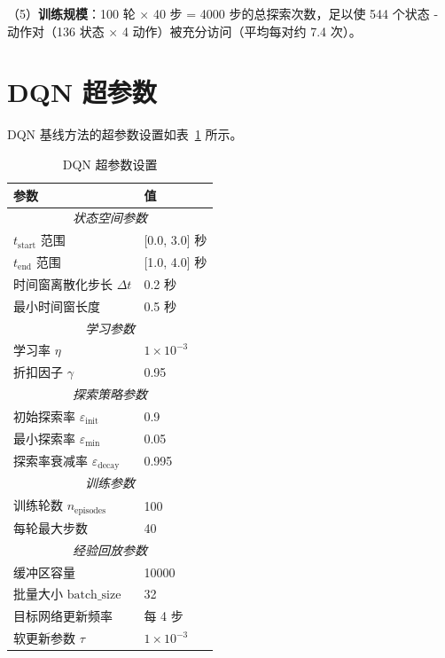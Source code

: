 （5）\textbf{训练规模}：100 轮 × 40 步 = 4000 步的总探索次数，足以使 544 个状态 - 动作对（136 状态 × 4 动作）被充分访问（平均每对约 7.4 次）。

\section{DQN 超参数}
\label{sec:dqn_params}

DQN 基线方法的超参数设置如表~\ref{tab:dqn_params} 所示。

\begin{table}[H]
\centering
\caption{DQN 超参数设置}
\label{tab:dqn_params}
\begin{tabular}{ll}
\hline
\textbf{参数} & \textbf{值} \\
\hline
\multicolumn{2}{c}{\textit{状态空间参数}} \\
\hline
$t_{\text{start}}$ 范围 & [0.0, 3.0] 秒 \\
$t_{\text{end}}$ 范围 & [1.0, 4.0] 秒 \\
时间窗离散化步长 $\Delta t$ & 0.2 秒 \\
最小时间窗长度 & 0.5 秒 \\
\hline
\multicolumn{2}{c}{\textit{学习参数}} \\
\hline
学习率 $\eta$ & $1 \times 10^{-3}$ \\
折扣因子 $\gamma$ & 0.95 \\
\hline
\multicolumn{2}{c}{\textit{探索策略参数}} \\
\hline
初始探索率 $\varepsilon_{\text{init}}$ & 0.9 \\
最小探索率 $\varepsilon_{\text{min}}$ & 0.05 \\
探索率衰减率 $\varepsilon_{\text{decay}}$ & 0.995 \\
\hline
\multicolumn{2}{c}{\textit{训练参数}} \\
\hline
训练轮数 $n_{\text{episodes}}$ & 100 \\
每轮最大步数 & 40 \\
\hline
\multicolumn{2}{c}{\textit{经验回放参数}} \\
\hline
缓冲区容量 & 10000 \\
批量大小 $\text{batch\_size}$ & 32 \\
目标网络更新频率 & 每 4 步 \\
软更新参数 $\tau$ & $1 \times 10^{-3}$ \\
\hline
\end{tabular}
\end{table}


